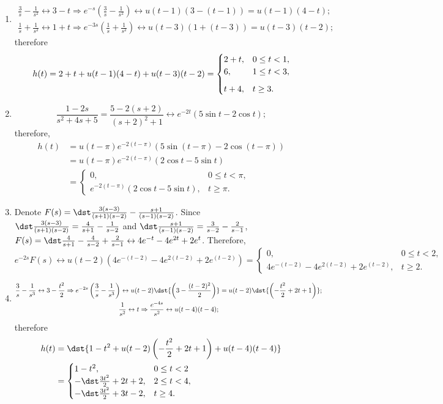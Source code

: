 \documentclass[openany]{book}
\newenvironment{sectionSolutions}{
 \begin{enumerate}[item-label={\thesection.\arabic{enumi}.}]
}{
 \end{enumerate}
}
\begin{document}
\begin{sectionSolutions}
\item
\begin{gather*}
\frac{3}{ s}-\frac{1}{ s^2}\leftrightarrow 3-t\Rightarrow
e^{-s}\left(\frac{3}{ s}-\frac{1}{ s^2}\right)\leftrightarrow
u(t-1)\left(3-(t-1)\right)=u(t-1)(4-t);
\\
\frac{1}{ s}+\frac{1}{ s^2}\leftrightarrow 1+t\Rightarrow
e^{-3s}\left(\frac{1}{ s}+\frac{1}{ s^2}\right)\leftrightarrow
u(t-3)\left(1+(t-3)\right)=u(t-3)(t-2);
\end{gather*}
therefore
\[
h(t)=2+t+u(t-1)(4-t)+u(t-3)(t-2)
=\begin{cases}
2+t,&0\le t<1,\\
6,&1\le t<3,\\[2\jot] t+4,&t\ge3.
\end{cases}
\]



\item
\[
\frac{1-2s}{ s^2+4s+5}=\frac{5-2(s+2)}{(s+2)^2+1}\leftrightarrow
e^{-2t}(5\sin t-2\cos t);
\]
therefore,
\begin{align*}
h(t)&=u(t-\pi)e^{-2(t-\pi)} \left(5\sin(t-\pi)-2\cos(t-\pi)\right)\\
&=u(t-\pi)e^{-2(t-\pi)} (2\cos t-5\sin t)\\
&=\begin{cases} 0, &0\le t<\pi,\\
e^{-2(t-\pi)}(2\cos t-5\sin t),&t\ge\pi.\end{cases}
\end{align*}


\item
Denote $F(s)=\dst\frac{3(s-3)}{(s+1)(s-2)}-\frac{s+1}{(s-1)(s-2)}$.
Since $\dst\frac{3(s-3)}{(s+1)(s-2)}=\frac{4}{ s+1}-\frac{1}{
s-2}$ and
$\dst\frac{s+1}{(s-1)(s-2)}=\frac{3}{ s-2}-\frac{2}{ s-1}$,
  $F(s)=\dst\frac{4}{ s+1}-\frac{4}{ s-2}+\frac{2}{ s-1}
\leftrightarrow4e^{-t}-4e^{2t}+2e^t$.
Therefore,
\[
e^{-2s}F(s)\leftrightarrow
u(t-2)\left
(4e^{-(t-2)}-4e^{2(t-2)}+2e^{(t-2)}\right)=
\begin{cases} 0,&0\le t<2,\\
4e^{-(t-2)}-4e^{2(t-2)}+2e^{(t-2)},&t\ge2.
\end{cases}
\]


\item
\begin{gather*}
\frac{3}{ s}-\frac{1}{ s^3}\leftrightarrow 3-\frac{t^2}{2}\Rightarrow
e^{-2s}\left(\frac{3}{ s}-\frac{1}{ s^3}\right)\leftrightarrow
u(t-2)\dst{\left(3-\frac{(t-2)^2}{2}\right)}=u(t-2)
\dst{\left(-\frac{t^2}{2}+2t+1\right)};
\\
\frac{1}{ s^2}\leftrightarrow t\Rightarrow
\frac{e^{-4s}}{ s^2}\leftrightarrow u(t-4)(t-4);
\end{gather*}
therefore
\begin{align*}
h(t)&=\dst{1-t^2+u(t-2)\left(-\frac{t^2}{2}+2t+1\right) +u(t-4)(t-4)}\\
&=
\begin{cases} 1-t^2,&0\le t<2\\
-\dst\frac{3t^2}{2} +2t+2,&2\le t<4,\\
-\dst\frac{3t^2}{2}+3t-2,&t\ge 4.
\end{cases}
\end{align*}



\end{sectionSolutions}
\end{document}
